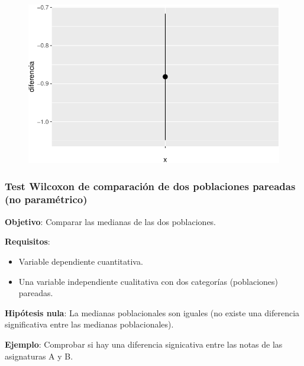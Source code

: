 \documentclass[
  a4paper,
]{scrreport}
\newenvironment{Shaded}{\begin{snugshade}}{\end{snugshade}}
\newcommand{\AttributeTok}[1]{\textcolor[rgb]{0.40,0.45,0.13}{#1}}
\newcommand{\ConstantTok}[1]{\textcolor[rgb]{0.56,0.35,0.01}{#1}}
\newcommand{\FunctionTok}[1]{\textcolor[rgb]{0.28,0.35,0.67}{#1}}
\newcommand{\NormalTok}[1]{\textcolor[rgb]{0.00,0.23,0.31}{#1}}
\newcommand{\SpecialCharTok}[1]{\textcolor[rgb]{0.37,0.37,0.37}{#1}}
\newcommand{\StringTok}[1]{\textcolor[rgb]{0.13,0.47,0.30}{#1}}
\providecommand{\tightlist}{%
  \setlength{\itemsep}{0pt}\setlength{\parskip}{0pt}}\usepackage{longtable,booktabs,array}
\theoremstyle{definition}
\theoremstyle{definition}
\theoremstyle{remark}
\begin{document}
\begin{figure}[H]

{\centering \includegraphics{08-analisis-estadisticos_files/figure-pdf/unnamed-chunk-43-1.pdf}

}

\end{figure}

\hypertarget{test-wilcoxon-de-comparaciuxf3n-de-dos-poblaciones-pareadas-no-paramuxe9trico}{%
\subsubsection{Test Wilcoxon de comparación de dos poblaciones pareadas
(no
paramétrico)}\label{test-wilcoxon-de-comparaciuxf3n-de-dos-poblaciones-pareadas-no-paramuxe9trico}}

\textbf{Objetivo}: Comparar las medianas de las dos poblaciones.

\textbf{Requisitos}:

\begin{itemize}
\tightlist
\item
  Variable dependiente cuantitativa.
\item
  Una variable independiente cualitativa con dos categorías
  (poblaciones) pareadas.
\end{itemize}

\textbf{Hipótesis nula}: La medianas poblacionales son iguales (no
existe una diferencia significativa entre las medianas poblacionales).

\textbf{Ejemplo}: Comprobar si hay una diferencia signicativa entre las
notas de las asignaturas A y B.

\begin{Shaded}
\end{Shaded}
\end{document}
